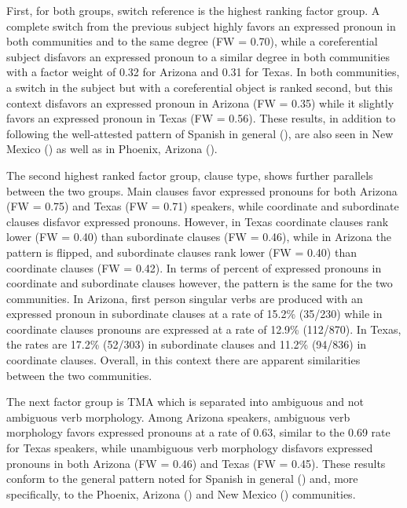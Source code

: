 \documentclass[output=paper]{langscibook}
\begin{document}
First, for both groups, switch reference is the highest ranking factor group. A complete switch from the previous subject highly favors an expressed pronoun in both communities and to the same degree (FW = 0.70), while a coreferential subject disfavors an expressed pronoun to a similar degree in both communities with a factor weight of 0.32 for Arizona and 0.31 for Texas. In both communities, a switch in the subject but with a coreferential object is ranked second, but this context disfavors an expressed pronoun in Arizona (FW = 0.35) while it slightly favors an expressed pronoun in Texas (FW = 0.56). These results, in addition to following the well-attested pattern of Spanish in general (\citealt{CarvalhoShin2015}), are also seen in New Mexico (\citealt{TorresCacoullosTravis2010a}) as well as in Phoenix, Arizona (\citealt{Cerrón-Palomino2016}). 



The second highest ranked factor group, clause type, shows further parallels between the two groups. Main clauses favor expressed pronouns for both Arizona (FW = 0.75) and Texas (FW = 0.71) speakers, while coordinate and subordinate clauses disfavor expressed pronouns. However, in Texas coordinate clauses rank lower (FW = 0.40) than subordinate clauses (FW = 0.46), while in Arizona the pattern is flipped, and subordinate clauses rank lower (FW = 0.40) than coordinate clauses (FW = 0.42). In terms of percent of expressed pronouns in coordinate and subordinate clauses however, the pattern is the same for the two communities. In Arizona, first person singular verbs are produced with an expressed pronoun in subordinate clauses at a rate of 15.2\% (35/230) while in coordinate clauses pronouns are expressed at a rate of 12.9\% (112/870). In Texas, the rates are 17.2\% (52/303) in subordinate clauses and 11.2\% (94/836) in coordinate clauses. Overall, in this context there are apparent similarities between the two communities.



The next factor group is TMA which is separated into ambiguous and not ambiguous verb morphology. Among Arizona speakers, ambiguous verb morphology favors expressed pronouns at a rate of 0.63, similar to the 0.69 rate for Texas speakers, while unambiguous verb morphology disfavors expressed pronouns in both Arizona (FW = 0.46) and Texas (FW = 0.45). These results conform to the general pattern noted for Spanish in general (\citealt{CarvalhoShin2015}) and, more specifically, to the Phoenix, Arizona (\citealt{Cerrón-Palomino2016}) and New Mexico (\citealt{TorresCacoullosTravis2010a}) communities. 
\end{document}
